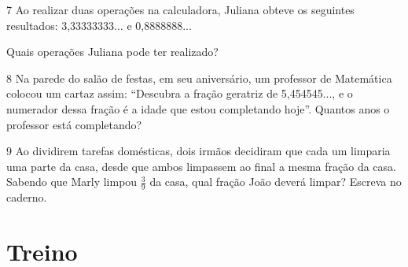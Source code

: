 
\num{7} Ao realizar duas operações na calculadora, Juliana obteve os
seguintes resultados: 3,33333333... e 0,8888888...

Quais operações Juliana pode ter realizado?










\num{8} Na parede do salão de festas, em seu aniversário, um professor de Matemática colocou um cartaz assim: ``Descubra a fração geratriz de
5,454545..., e o numerador dessa fração é a idade que estou
completando hoje''. Quantos anos o professor está completando?








\num{9} Ao dividirem tarefas domésticas, dois irmãos
decidiram que cada um limparia uma parte da casa, desde que ambos
limpassem ao final a mesma fração da casa. Sabendo que Marly limpou
$\frac{3}{9}$ da casa, qual fração João deverá limpar? Escreva no caderno.


\section*{Treino}

